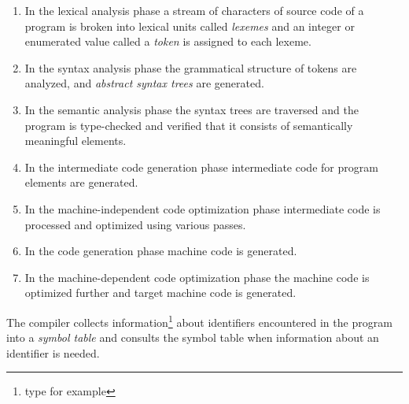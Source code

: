 \documentclass[a4paper,oneside,11pt]{book}
\theoremstyle{definition}
\begin{document}
\begin{enumerate}

\item
In the lexical analysis phase a stream of characters of source code of a program is broken into lexical units called \emph{lexemes} and
an integer or enumerated value called a \emph{token} is assigned to each lexeme.

\item
In the syntax analysis phase the grammatical structure of tokens are analyzed, and \emph{abstract syntax trees} are generated.

\item
In the semantic analysis phase the syntax trees are traversed and the program is type-checked and verified that it consists
of semantically meaningful elements.

\item
In the intermediate code generation phase intermediate code for program elements are generated.

\item
In the machine-independent code optimization phase intermediate code is processed and optimized using various passes.

\item
In the code generation phase machine code is generated.

\item
In the machine-dependent code optimization phase the machine code is optimized further and target machine code is generated.

\end{enumerate}

The compiler collects information\footnote{type for example} about identifiers encountered in the program into a \emph{symbol table} and
consults the symbol table when information about an identifier is needed.
\end{document}
